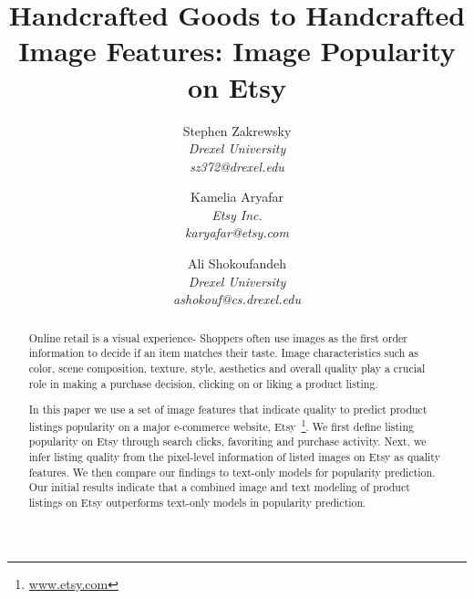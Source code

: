 \documentclass[conference,a4paper]{IEEEtran}
\begin{document}
%
\title{Handcrafted Goods to Handcrafted Image Features: Image Popularity on Etsy}



 \author{
Stephen Zakrewsky\\
\emph{Drexel University}\\
\emph{sz372@drexel.edu}
\and
Kamelia Aryafar\\ 
\emph {Etsy Inc.}\\
\emph {karyafar@etsy.com}
\and
Ali Shokoufandeh\\
\emph{Drexel University}\\
\emph{ashokouf@cs.drexel.edu}}



\maketitle

\begin{abstract}
Online retail is a visual experience- Shoppers often use images as the first
 order information to decide if an item matches their taste. 
 Image characteristics such as color, scene composition, texture, style, 
 aesthetics and overall quality play a crucial role in
  making a purchase decision, clicking on or liking a product listing. 

In this paper we use a set of image features that indicate quality
   to predict product listings popularity on a major e-commerce website, Etsy~\footnote{\url{www.etsy.com}}.
   We first define listing popularity on Etsy through search clicks, favoriting and purchase activity. Next, we infer listing quality from the pixel-level information of listed images on Etsy as quality features. We then compare our findings to text-only models for popularity prediction. Our initial results indicate that a combined image and text modeling of product listings on Etsy outperforms text-only models in popularity prediction.

\end{abstract}
\end{document}
